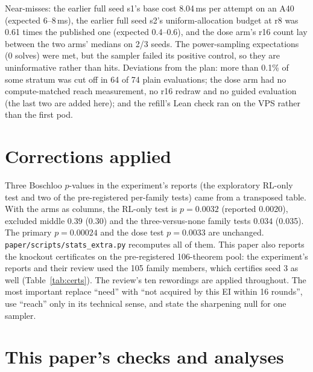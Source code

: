 Near-misses: the earlier full seed s1's base cost 8.04\,ms per attempt on an A40 (expected 6--8\,ms), the earlier full
seed s2's uniform-allocation budget at r8 was 0.61 times the published one (expected 0.4--0.6), and the dose arm's r16
count lay between the two arms' medians on 2/3 seeds. The
power-sampling expectations (0 solves) were met, but the sampler failed its positive control, so they are uninformative
rather than hits. Deviations from the plan: more than 0.1\% of some stratum was cut off in 64 of 74 plain evaluations;
the dose arm had no compute-matched reach measurement, no r16 redraw and no guided evaluation (the last two are added
here); and the refill's Lean check ran on the VPS rather than the first pod.

\section{Corrections applied}
\label{app:corrections}
Three Boschloo $p$-values in the experiment's reports (the exploratory RL-only test and two of the pre-registered
per-family tests) came from a transposed table. With the arms as
columns, the RL-only test is $p = 0.0032$ (reported 0.0020), excluded middle $0.39$ (0.30) and the three-versus-none
family tests $0.034$ (0.035). The primary $p = 0.00024$ and the dose test $p = 0.0033$ are unchanged.
\texttt{paper/scripts/stats\_extra.py} recomputes all of them. This paper also reports the knockout certificates on the
pre-registered 106-theorem pool: the experiment's reports and their review used the 105 family members, which certifies
seed 3 as well (Table~\ref{tab:certs}). The review's ten rewordings are applied throughout. The most important replace
``need'' with ``not acquired by this EI within 16 rounds'', use ``reach'' only in its technical sense, and state the
sharpening null for one sampler.

\section{This paper's checks and analyses}
\label{sec:checks}


